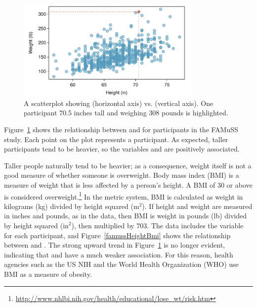 
\begin{figure}[h!]
\centering
\includegraphics[width=0.8\textwidth]
{ch_intro_to_data_oi_biostat/figures/famussHeightWeight/famussHeightWeight}
\caption{A scatterplot showing  (horizontal axis) vs.  (vertical axis). One participant 70.5 inches tall and weighing 308 pounds is highlighted.}
\label{famussHeightWeight}
\end{figure}

Figure~\ref{famussHeightWeight} shows the relationship between  and  for participants in the FAMuSS study.  Each point on the plot represents a participant. As expected, taller participants tend to be heavier, so the variables  and  are positively associated.  

Taller people naturally tend to be heavier; as a consequence, weight itself is not a good measure of whether someone is overweight. Body mass index (BMI) is a measure of weight that is less affected by a person's height. A BMI of 30 or above is considered overweight.\footnote{\url{http://www.nhlbi.nih.gov/health/educational/lose_wt/risk.htm}} In the metric system, BMI is calculated as weight in kilograms (kg) divided by height squared ($\textrm {m}^{2}$). If height and weight are measured in inches and pounds, as in the  data, then BMI is weight in pounds (lb) divided by height squared ($\textrm {in}^{2}$), then multiplied by 703. The  data includes the variable  for each participant, and Figure~\ref{famussHeightBmi} shows the relationship between  and . The strong upward trend in Figure~\ref{famussHeightWeight} is no longer evident, indicating that  and  have a much weaker association. For this reason, health agencies such as the US NIH and the World Health Organization (WHO) use BMI as a measure of obesity. 

